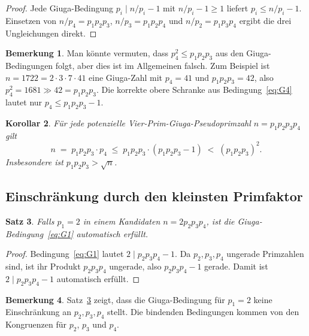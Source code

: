 \documentclass[12pt,a4paper]{amsart}
\newtheorem{theorem}{Satz}[section]
\newtheorem{corollary}[theorem]{Korollar}
\theoremstyle{definition}
\newtheorem{remark}[theorem]{Bemerkung}
\begin{document}
\begin{proof}
Jede Giuga-Bedingung $p_i \mid n/p_i - 1$ mit $n/p_i - 1 \ge 1$ liefert
$p_i \le n/p_i - 1$.  Einsetzen von $n/p_4 = p_1 p_2 p_3$, $n/p_3 = p_1 p_2 p_4$
und $n/p_2 = p_1 p_3 p_4$ ergibt die drei Ungleichungen direkt.
\end{proof}

\begin{remark}
\label{bem:keine-quadratschranke}
Man könnte vermuten, dass $p_4^2 \le p_1 p_2 p_3$ aus den Giuga-Bedingungen
folgt, aber dies ist im Allgemeinen falsch.  Zum Beispiel ist $n = 1722 =
2 \cdot 3 \cdot 7 \cdot 41$ eine Giuga-Zahl mit $p_4 = 41$ und
$p_1 p_2 p_3 = 42$, also $p_4^2 = 1681 \gg 42 = p_1 p_2 p_3$.  Die korrekte
obere Schranke aus Bedingung~\eqref{eq:G4} lautet nur $p_4 \le p_1 p_2 p_3 - 1$.
\end{remark}

\begin{corollary}
\label{kor:groesseschranke}
Für jede potenzielle Vier-Prim-Giuga-Pseudoprimzahl $n = p_1 p_2 p_3 p_4$ gilt
\[
  n \;=\; p_1 p_2 p_3 \cdot p_4 \;\le\; p_1 p_2 p_3 \cdot (p_1 p_2 p_3 - 1)
  \;<\; (p_1 p_2 p_3)^2.
\]
Insbesondere ist $p_1 p_2 p_3 > \sqrt{n}$.
\end{corollary}

\subsection{Einschränkung durch den kleinsten Primfaktor}

\begin{theorem}
\label{satz:p1auto}
Falls $p_1 = 2$ in einem Kandidaten $n = 2 p_2 p_3 p_4$, ist die
Giuga-Bedingung~\eqref{eq:G1} automatisch erfüllt.
\end{theorem}

\begin{proof}
Bedingung~\eqref{eq:G1} lautet $2 \mid p_2 p_3 p_4 - 1$.  Da
$p_2, p_3, p_4$ ungerade Primzahlen sind, ist ihr Produkt $p_2 p_3 p_4$ ungerade,
also $p_2 p_3 p_4 - 1$ gerade.  Damit ist $2 \mid p_2 p_3 p_4 - 1$
automatisch erfüllt.
\end{proof}

\begin{remark}
Satz~\ref{satz:p1auto} zeigt, dass die Giuga-Bedingung für $p_1 = 2$ keine
Einschränkung an $p_2, p_3, p_4$ stellt.  Die bindenden Bedingungen kommen
von den Kongruenzen für $p_2$, $p_3$ und $p_4$.
\end{remark}
\end{document}
